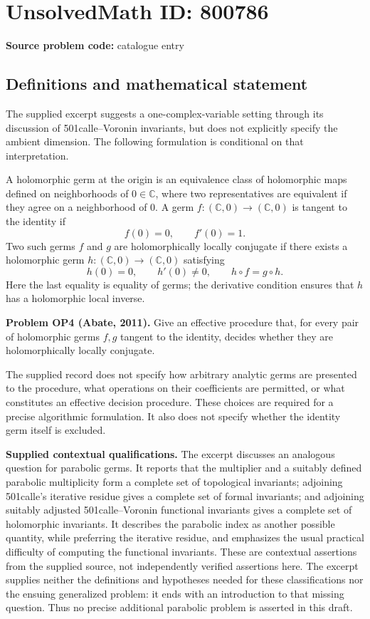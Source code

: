 \documentclass[11pt]{article}
\newcommand{\C}{\mathbb{C}}
\begin{document}
\section*{UnsolvedMath ID: 800786}
\textbf{Source problem code:} catalogue entry
\subsection{Definitions and mathematical statement}
The supplied excerpt suggests a one-complex-variable setting through its discussion of \8501calle--Voronin invariants, but does not explicitly specify the ambient dimension. The following formulation is conditional on that interpretation.

A holomorphic germ at the origin is an equivalence class of holomorphic maps defined on neighborhoods of \(0\in\C\), where two representatives are equivalent if they agree on a neighborhood of \(0\). A germ \(f:(\C,0)\to(\C,0)\) is tangent to the identity if
\[
f(0)=0,\qquad f'(0)=1.
\]
Two such germs \(f\) and \(g\) are holomorphically locally conjugate if there exists a holomorphic germ \(h:(\C,0)\to(\C,0)\) satisfying
\[
h(0)=0,\qquad h'(0)\ne0,\qquad h\circ f=g\circ h.
\]
Here the last equality is equality of germs; the derivative condition ensures that \(h\) has a holomorphic local inverse.

\textbf{Problem OP4 (Abate, 2011).} Give an effective procedure that, for every pair of holomorphic germs \(f,g\) tangent to the identity, decides whether they are holomorphically locally conjugate.

The supplied record does not specify how arbitrary analytic germs are presented to the procedure, what operations on their coefficients are permitted, or what constitutes an effective decision procedure. These choices are required for a precise algorithmic formulation. It also does not specify whether the identity germ itself is excluded.

\textbf{Supplied contextual qualifications.} The excerpt discusses an analogous question for parabolic germs. It reports that the multiplier and a suitably defined parabolic multiplicity form a complete set of topological invariants; adjoining \8501calle's iterative residue gives a complete set of formal invariants; and adjoining suitably adjusted \8501calle--Voronin functional invariants gives a complete set of holomorphic invariants. It describes the parabolic index as another possible quantity, while preferring the iterative residue, and emphasizes the usual practical difficulty of computing the functional invariants. These are contextual assertions from the supplied source, not independently verified assertions here. The excerpt supplies neither the definitions and hypotheses needed for these classifications nor the ensuing generalized problem: it ends with an introduction to that missing question. Thus no precise additional parabolic problem is asserted in this draft.
\end{document}
